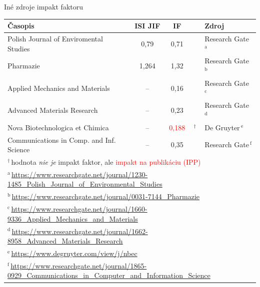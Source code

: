 \documentclass{beamer}
\begin{document}
\begin{frame}{Iné zdroje impakt faktoru}
  \begin{table}
    \footnotesize
    \begin{tabular}{lcc@{\,}ll}
      \toprule
      Časopis & ISI JIF & IF &  & Zdroj \\
      \midrule
      Polish Journal of Enviromental Studies   & 0,79\phantom{0} &        0,71\phantom{0}&           & Research Gate\,$^{\mathrm{a}}$ \\[0.5ex]
      Pharmazie                                & 1,264           &        1,32\phantom{0}&           & Research Gate\,$^{\mathrm{b}}$ \\[0.5ex]
      Applied Mechanics and Materials          & --              &        0,16\phantom{0}&           & Research Gate\,$^{\mathrm{c}}$ \\[0.5ex]
      Advanced Materials Research              & --              &        0,23\phantom{0}&           & Research Gate\,$^{\mathrm{d}}$ \\[0.5ex]
      Nova Biotechnologica et Chimica          & --              & \textcolor{Red}{0,188}&$^\dagger$ & De Gruyter\,$^{\mathrm{e}}$    \\[0.5ex]
      Communications in Comp. and Inf. Science & --              &        0,35\phantom{0}&           & Research Gate\,$^{\mathrm{f}}$ \\[0.5ex]
      \bottomrule
      \multicolumn{5}{l}{\tiny $^\dagger$\,hodnota \emph{nie je} impakt faktor, ale \textcolor{Red}{impakt na publikáciu (IPP)}} \\
      \multicolumn{5}{l}{\tiny $^{\mathrm{a}}$\,\url{https://www.researchgate.net/journal/1230-1485\_Polish\_Journal\_of\_Environmental\_Studies}} \\
      \multicolumn{5}{l}{\tiny $^{\mathrm{b}}$\,\url{https://www.researchgate.net/journal/0031-7144\_Pharmazie}} \\
      \multicolumn{5}{l}{\tiny $^{\mathrm{c}}$\,\url{https://www.researchgate.net/journal/1660-9336\_Applied\_Mechanics\_and\_Materials}} \\
      \multicolumn{5}{l}{\tiny $^{\mathrm{d}}$\,\url{https://www.researchgate.net/journal/1662-8958\_Advanced\_Materials\_Research}} \\
      \multicolumn{5}{l}{\tiny $^{\mathrm{e}}$\,\url{https://www.degruyter.com/view/j/nbec}} \\
      \multicolumn{5}{l}{\tiny $^{\mathrm{f}}$\,\url{https://www.researchgate.net/journal/1865-0929\_Communications\_in\_Computer\_and\_Information\_Science}} \\
    \end{tabular}
  \end{table}
\end{frame}
\end{document}
